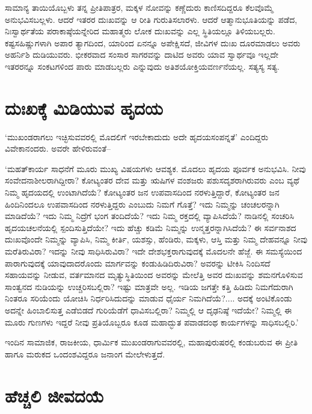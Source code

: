ಸಾಮಾನ್ಯ ತಾಯಿಯೊಬ್ಬಳು ತನ್ನ ಪ್ರೀತಿಪಾತ್ರರ, ಮಕ್ಕಳ ನೋವನ್ನು ಕಣ್ಣೆದುರು ಕಾಣಿಸ\-ದಿದ್ದರೂ ಕೆಲವೊಮ್ಮೆ ಅನುಭವಿಸಬಲ್ಲಳು. ಆದರೆ ಇತರರ ದುಃಖವನ್ನು ಆ ರೀತಿ ಗುರುತಿಸಲಾರಳು. ಆದರೆ ಆತ್ಮಾನುಭೂತಿಯನ್ನು ಪಡೆದ, ನಿಃಸ್ವಾರ್ಥತೆಯ ಪರಾಕಾಷ್ಠೆಯನ್ನೇರಿದ ಮಹಾತ್ಮರು ಲೋಕ ದುಃಖವನ್ನು ಎಲ್ಲ ಸ್ಥಿತಿಯಲ್ಲೂ ತಿಳಿಯಬಲ್ಲರು. ಕಷ್ಟಸಹಿಷ್ಣುಗಳಾಗಿ ಅಪಾರ ತ್ಯಾಗದಿಂದ, ಯಾರಿಂದ ಏನನ್ನೂ ಅಪೇಕ್ಷಿಸದೆ, ಜೀವಿಗಳ ದುಃಖ ದೂರಮಾಡಲು ಅವರು ಅಹರ್ನಿಶಿ ದುಡಿಯುವರು. ಭೀಕರವಾದ ಸಂಸಾರ ಸಾಗರವನ್ನು ದಾಟಿದ ಅವರು ಯಾವ ಸ್ವಾರ್ಥವೂ ಇಲ್ಲದೇ ಇತರರನ್ನೂ ಸಂಕಟಗಳಿಂದ ಪಾರು ಮಾಡಬಲ್ಲರು ಎನ್ನುವುದು ಅತಿಶಯೋಕ್ತಿಯ\break ವರ್ಣನೆಯಲ್ಲ. ಸತ್ಯಸ್ಯ ಸತ್ಯ.


\section*{ದುಃಖಕ್ಕೆ ಮಿಡಿಯುವ ಹೃದಯ}


‘ಮುಖಂಡರಾಗಲು ಇಚ್ಛಿಸುವವರಲ್ಲಿ ಮೊದಲಿಗೆ ಇರಬೇಕಾದುದು ಅದೇ ಹೃದಯಸಂಪನ್ನತೆ’ ಎಂದಿದ್ದರು ವಿವೇಕಾನಂದರು. ಅವರೇ ಹೇಳಿರುವಂತೆ–

‘ಮಹತ್​ಕಾರ್ಯ ಸಾಧನೆಗೆ ಮೂರು ಮುಖ್ಯ ವಿಷಯಗಳು ಆವಶ್ಯಕ. ಮೊದಲು ಹೃದಯ ಪೂರ್ವಕ ಅನುಭವಿಸಿ. ನೀವು ಸಂವೇದನಾಶೀಲರಾಗಿದ್ದೀರಾ? ಕೋಟ್ಯಂತರ ದೇವ ಮತ್ತು ಋಷಿಗಳ ವಂಶಜರು ಪಶುಸದೃಶರಾಗಿರುವರು ಎಂಬ ವ್ಯಥೆ ನಿಮ್ಮ ಹೃದಯದಲ್ಲಿ ಉಂಟಾಗಿದೆಯೆ? ಕೋಟ್ಯಂತರ ಜನ ಉಪವಾಸದಿಂದ ನರಳುತ್ತಿದ್ದಾರೆ, ಕೋಟ್ಯಂತರ ಜನ ಹಿಂದಿನಿಂದಲೂ ಉಪವಾಸದಿಂದ ನರಳುತ್ತಿದ್ದರು ಎಂಬುದು ನಿಮಗೆ ಗೊತ್ತೆ? ಇದು ನಿಮ್ಮನ್ನು ಚಂಚಲರನ್ನಾಗಿ ಮಾಡಿದೆಯೆ? ಇದು ನಿಮ್ಮ ನಿದ್ರೆಗೆ ಭಂಗ ತಂದಿದೆಯೆ? ಇದು ನಿಮ್ಮ ರಕ್ತದಲ್ಲಿ ವ್ಯಾಪಿಸಿದೆಯೆ? ನಾಡಿನಲ್ಲಿ ಸಂಚರಿಸಿ ಹೃದಯಚಲನೆಯಲ್ಲಿ ಸ್ಪಂದಿಸುತ್ತಿದೆಯೇ? ಇದು ಹೆಚ್ಚು ಕಡಿಮೆ ನಿಮ್ಮನ್ನು ಉನ್ಮತ್ತರನ್ನಾಗಿಸಿದೆಯೆ? ಈ ಸರ್ವನಾಶದ ದುಃಖವೊಂದೇ ನಿಮ್ಮನ್ನು ವ್ಯಾಪಿಸಿ, ನಿಮ್ಮ ಕೀರ್ತಿ, ಯಶಸ್ಸು, ಹೆಂಡಿರು, ಮಕ್ಕಳು, ಆಸ್ತಿ ಮತ್ತು ನಿಮ್ಮ ದೇಹವನ್ನೂ ನೀವು ಮರೆತಿರುವಿರಾ? ಇದನ್ನು ನೀವು ಸಾಧಿಸಿರುವಿರಾ? ಇದೇ ದೇಶಭಕ್ತರಾಗುವುದಕ್ಕೆ ಮೊದಲನೇ ಹೆಜ್ಜೆ. ಈ ಸಮಸ್ಯೆಯಿಂದ ಪಾರಾಗುವುದಕ್ಕೆ ಯಾವುದಾದರೊಂದು ಮಾರ್ಗವನ್ನು ಕಂಡುಹಿಡಿದಿರುವಿರಾ? ಅವರನ್ನು ಟೀಕಿಸಿ ನಿಂದಿಸದೆ ಸಹಾಯವನ್ನು ನೀಡುವ, ವರ್ತಮಾನದ ಮೃತ್ಯುಸ್ಥಿತಿಯಿಂದ ಅವರನ್ನು ಮೇಲೆತ್ತಿ ಅವರ ದುಃಖವನ್ನು ಶಮನಗೊಳಿಸುವ ಸಾಂತ್ವನದ ನುಡಿಯನ್ನು ಉಚ್ಚರಿಸಬಲ್ಲಿರಾ? ಇಷ್ಟು ಮಾತ್ರವೇ ಅಲ್ಲ. ಇಡಿಯ ಜಗತ್ತೇ ಕತ್ತಿ ಹಿಡಿದು ನಿಮಗೆದುರಾಗಿ ನಿಂತರೂ ಸರಿಯೆಂದು ಯೋಚಿಸಿ ನಿರ್ಧರಿಸಿದುದನ್ನು ಮಾಡುವ ಧೈರ್ಯ ನಿಮಗಿದೆಯೆ?.... ಅದಕ್ಕೆ ಅಂಟಿಕೊಂಡು ಅದನ್ನೇ ಹಿಂಬಾಲಿಸುತ್ತ ಎಡೆಬಿಡದೆ ಗುರಿಯೆಡೆಗೆ ಧಾವಿಸಬಲ್ಲಿರಾ? ನಿಮ್ಮಲ್ಲಿ ಆ ದೃಢನಿಷ್ಠೆ ಇದೆಯೇ? ನಿಮ್ಮಲ್ಲಿ ಈ ಮೂರು ಗುಣಗಳು ಇದ್ದರೆ ನೀವು ಪ್ರತಿಯೊಬ್ಬರೂ ಕೂಡ ಮಹಾದ್ಭುತ ಪವಾಡದಂಥ ಕಾರ್ಯಗಳನ್ನು ಸಾಧಿಸಬಲ್ಲಿರಿ.’

\vskip 2pt

ಇಂದಿನ ಸಾಮಾಜಿಕ, ರಾಜಕೀಯ, ಧಾರ್ಮಿಕ ಮುಖಂಡರಾಗುವವರಲ್ಲಿ, ಮಹಾಪುರುಷರಲ್ಲಿ ಕಂಡುಬರುವ ಈ ಪ್ರೀತಿ ಹಾಗೂ ಮರುಕದ ಒಂದಂಶವಿದ್ದರೂ ಜನಾಂಗ ಮೇಲೇಳುತ್ತದೆ.


\section*{ಹೆಚ್ಚಲಿ ಜೀವದಯೆ}

